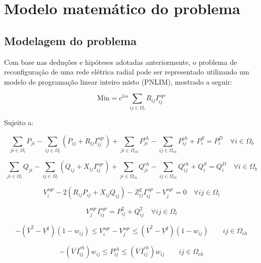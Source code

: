 \section{Modelo matemático do problema}
\subsection{Modelagem do problema}


Com base nas deduções e hipóteses adotadas anteriormente, o problema de reconfiguração de uma rede elétrica radial pode ser representado utilizando um modelo de programação linear inteiro misto (PNLIM), mostrado a seguir:

\begin{equation*}
    \text{Min} = c^{lss}\sum_{ij\in\Omega_{l}}R_{ij}I_{ij}^{sqr}
\end{equation*}

Sujeito a:

\begin{equation*}
    \sum_{ji\in\Omega_{l}}P_{ji} - \sum_{ij\in\Omega_{l}}(P_{ij} + R_{ij}I_{ij}^{sqr})+ \sum_{ji\in\Omega_{ch}}P_{ji}^{ch} -\sum_{ij\in\Omega_{ch}}P_{ij}^{ch} + P_{i}^{S} = P_{i}^{D}\quad\forall i \in\Omega_{b}  
\end{equation*}
    
\begin{equation*}
    \sum_{ji\in\Omega_{l}}Q_{ji} - \sum_{ij\in\Omega_{l}}(Q_{ij} + X_{ij}I_{ij}^{sqr})+ \sum_{ji\in\Omega_{ch}}Q_{ji}^{ch} -\sum_{ij\in\Omega_{ch}}Q_{ij}^{ch} + Q_{i}^{S} = Q_{i}^{D}\quad\forall i \in\Omega_{b}
\end{equation*}

\begin{equation*}
    V_{i}^{sqr} - 2(R_{ij}P_{ij} + X_{ij}Q_{ij}) - Z_{ij}^{2}I_{ij}^{sqr} - V_{j}^{sqr} = 0\quad\forall ij \in \Omega_{l}
\end{equation*}

\begin{equation*}
    V_{j}^{sqr}I_{ij}^{sqr} = P_{ij}^{2}+Q_{ij}^{2}\quad\forall ij \in \Omega_{l}
\end{equation*}

\begin{equation*}
    -(\overline{V}^{2} - \underline{V}^{2})(1-w_{ij}) \leq V_{i}^{sqr} - V_{j}^{sqr} \leq (\overline{V}^{2} - \underline{V}^{2})(1-w_{ij})\qquad ij\in\Omega_{ch}        
\end{equation*}
    
\begin{equation*}
    -(\overline{V}\,\overline{I}_{ij}^{ch})w_{ij} \leq P_{ij}^{ch} \leq (\overline{V}\,\overline{I}_{ij}^{ch})w_{ij}\qquad ij\in\Omega_{ch}
\end{equation*}
    
